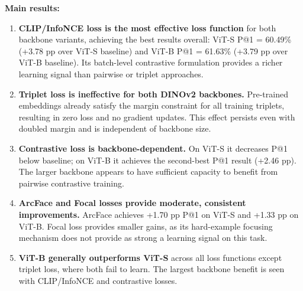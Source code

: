 \documentclass[
    english,
]{VUMIFPSbakalaurinis}
\begin{document}
\textbf{Main results:}
\begin{enumerate}
    \item \textbf{CLIP/InfoNCE loss is the most effective loss function} for both backbone variants, achieving the best results overall: ViT-S P@1 = 60.49\% (+3.78 pp over ViT-S baseline) and ViT-B P@1 = 61.63\% (+3.79 pp over ViT-B baseline). Its batch-level contrastive formulation provides a richer learning signal than pairwise or triplet approaches.

    \item \textbf{Triplet loss is ineffective for both DINOv2 backbones.} Pre-trained embeddings already satisfy the margin constraint for all training triplets, resulting in zero loss and no gradient updates. This effect persists even with doubled margin and is independent of backbone size.

    \item \textbf{Contrastive loss is backbone-dependent.} On ViT-S it decreases P@1 below baseline; on ViT-B it achieves the second-best P@1 result (+2.46 pp). The larger backbone appears to have sufficient capacity to benefit from pairwise contrastive training.

    \item \textbf{ArcFace and Focal losses provide moderate, consistent improvements.} ArcFace achieves +1.70 pp P@1 on ViT-S and +1.33 pp on ViT-B. Focal loss provides smaller gains, as its hard-example focusing mechanism does not provide as strong a learning signal on this task.

    \item \textbf{ViT-B generally outperforms ViT-S} across all loss functions except triplet loss, where both fail to learn. The largest backbone benefit is seen with CLIP/InfoNCE and contrastive losses.
\end{enumerate}
\end{document}
